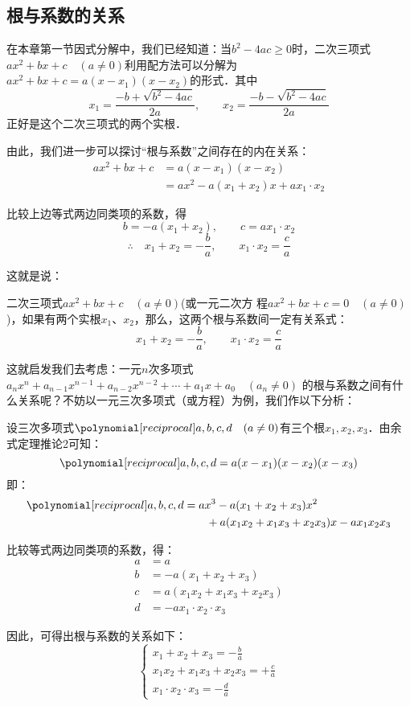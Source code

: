 \subsection{根与系数的关系}
在本章第一节因式分解中，我们已经知道：当$b^2-4ac\ge 0$时，二次三项式$ax^2+bx+c\quad (a\ne 0)$利用配方法可以分解为 $ax^2+bx+c=a(x-x_1)(x-x_2)$的形式．其中
\[x_1=\frac{-b+\sqrt{b^2-4ac}}{2a},\qquad x_2=\frac{-b-\sqrt{b^2-4ac}}{2a}\]
正好是这个二次三项式的两个实根．

由此，我们进一步可以探讨“根与系数”之间存在的内在关系：
\[\begin{split}
    ax^2+bx+c&=a (x-x_1) (x-x_2)\\
&=ax^2-a(x_1+x_2)x+ax_1\cdot x_2
\end{split}\]

比较上边等式两边同类项的系数，得
\[b=-a(x_1+x_2),\qquad c=ax_1\cdot x_2 \]
\[\therefore\quad x_1+x_2=-\frac{b}{a},\qquad x_1\cdot x_2=\frac{c}{a}\]

这就是说：
\begin{blk}{}
    二次三项式$ax^2+bx+c\quad (a\ne 0)$(或一元二次方
程$ax^2+bx+c=0\quad (a\ne 0)$ )，如果有两个实根$x_1$、$x_2$，那么，这两个根与系数间一定有关系式：
\[ x_1+x_2=-\frac{b}{a},\qquad x_1\cdot x_2=\frac{c}{a} \]
\end{blk}

这就启发我们去考虑：一元$n$次多项式
$a_nx^n+a_{n-1}x^{n-1}+a_{n-2}x^{n-2}+\cdots+a_1x+a_0\quad (a_n\ne 0)$
的根与系数之间有什么关系呢？不妨以一元三次多项式（或方程）为例，我们作以下分析：

设三次多项式$\poly{a,b,c,d}\quad (a\ne 0)$有三个根$x_1,x_2,x_3$．由余式定理推论2可知：
\[ \poly{a,b,c,d}=a(x-x_1)(x-x_2)(x-x_3) \]
即：
\[\begin{split}
    \poly{a,b,c,d} &= ax^3-a(x_1+x_2+x_3)x^2\\
    &\qquad +a(x_1x_2+x_1x_3+x_2x_3)x-ax_1x_2x_3
\end{split}\]

比较等式两边同类项的系数，得：
\[\begin{split}
    a&=a\\
    b&=-a(x_1+x_2+x_3)\\
    c&=a(x_1x_2+x_1x_3+x_2x_3)\\
    d&=-ax_1\cdot x_2\cdot x_3
\end{split}\]

因此，可得出根与系数的关系如下：
\[ \begin{cases}
    x_1+x_2+x_3 =-\frac{b}{a}\\
    x_1x_2+x_1x_3+x_2x_3=+\frac{c}{a}\\
    x_1\cdot x_2\cdot x_3=-\frac{d}{a}
\end{cases} \]

